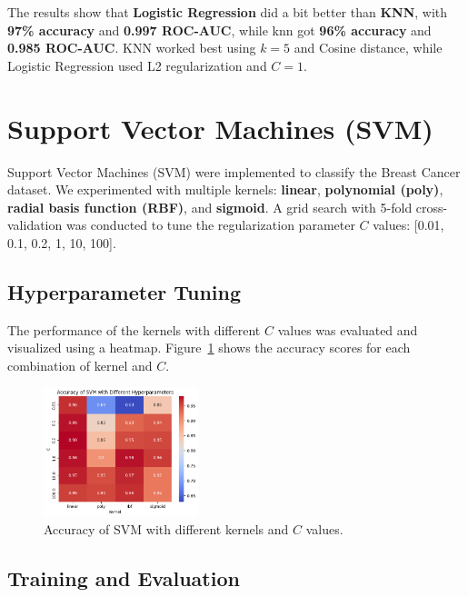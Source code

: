 \documentclass[12pt]{article}
\begin{document}
\vspace{-0.35cm}

The results show that \textbf{Logistic Regression} did a bit better than \textbf{KNN}, with \textbf{97\% accuracy} and \textbf{0.997 ROC-AUC}, while knn got \textbf{96\% accuracy} and \textbf{0.985 ROC-AUC}. KNN worked best using \(k=5\) and Cosine distance, while Logistic Regression used L2 regularization and \(C=1\).




\section{Support Vector Machines (SVM)}


Support Vector Machines (SVM) were implemented to classify the Breast Cancer dataset. We experimented with multiple kernels: \textbf{linear}, \textbf{polynomial (poly)}, \textbf{radial basis function (RBF)}, and \textbf{sigmoid}. A grid search with 5-fold cross-validation was conducted to tune the regularization parameter \(C\) values: [0.01, 0.1, 0.2, 1, 10, 100].\cite{hearst1998support}

\subsection*{Hyperparameter Tuning}

The performance of the kernels with different \(C\) values was evaluated and visualized using a heatmap. Figure~\ref{fig:svm_heatmap} shows the accuracy scores for each combination of kernel and \(C\).  

\begin{figure}[H]
    \centering
    \includegraphics[width=0.4\textwidth]{assets/svm/svm-param.png}
    \caption{Accuracy of SVM with different kernels and \(C\) values.}
    \label{fig:svm_heatmap}
\end{figure}
\vspace{-0.5cm}
\subsection*{Training and Evaluation}
\end{document}
